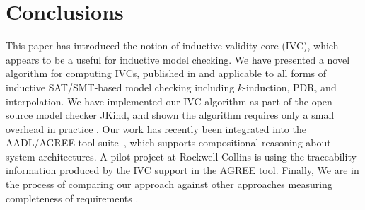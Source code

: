 \section{Conclusions}
\label{sec:conclusion}
This paper has introduced the notion of inductive validity core (IVC), which
appears to be a useful for inductive model checking. We have presented a novel algorithm for
computing IVCs, published in \cite{Ghass16} and
applicable to all forms of inductive SAT/SMT-based model checking
including $k$-induction, PDR, and interpolation. We have implemented our IVC algorithm as part of the open source model
checker JKind, and shown the algorithm requires only a
small overhead in practice \cite{Ghass16, expr}. Our work has recently been integrated into the AADL/AGREE tool
suite~\cite{QFCS15:backes, hilt2013}, which supports compositional
reasoning about system architectures. A pilot project at Rockwell
Collins is using the traceability information produced by the IVC
support in the AGREE tool. Finally, We are in the process of
comparing our approach against other approaches measuring completeness of
requirements \cite{expr}.
%


